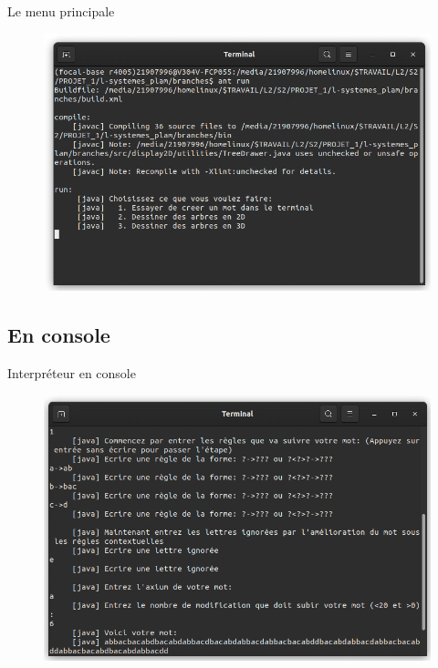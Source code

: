 \documentclass{beamer}
\begin{document}
\begin{frame}

	\begin{block}{Le menu principale}

	\begin{figure}[h]
	\includegraphics[scale=0.5]{images/menuPrincipale.png}
	\end{figure}

	\end{block}

\end{frame}


\subsection{En console}

\begin{frame}

	\begin{block}{Interpréteur en console}
	\begin{figure}[h]
	\includegraphics[scale=0.45]{images/treeConsole.png}
	\end{figure}

	\end{block}

\end{frame}
\end{document}
